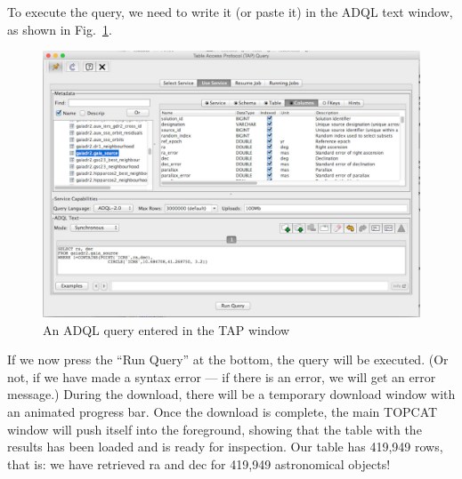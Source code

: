 \documentclass[twocolumn,apj]{openjournal}
\begin{document}
To execute the query, we need to write it (or paste it) in the ADQL text window, as shown in Fig.~\ref{ADQLWindow}.
\begin{figure}[htbp]
\begin{center}
\includegraphics[width=\linewidth]{gaia-query.jpg}
\caption{An ADQL query entered in the TAP window}
\label{ADQLWindow}
\end{center}
\end{figure}
If we now press the ``Run Query'' at the bottom, the query will be executed. (Or not, if we have made a syntax error --- if there is an error, we will get an error message.) During the download, there will be a temporary download window with an animated progress bar. Once the download is complete, the main TOPCAT window will push itself into the foreground, showing that the table with the results has been loaded and is ready for inspection. Our table has 419,949 rows, that is: we have retrieved ra and dec for 419,949 astronomical objects!
\end{document}
